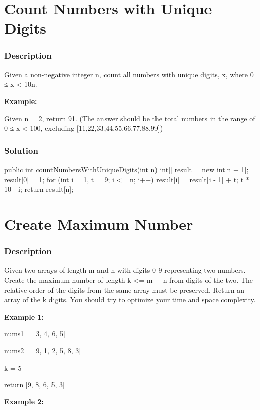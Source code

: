 \section{Count Numbers with Unique Digits} %

\subsubsection{Description}
Given a non-negative integer n, count all numbers with unique digits, x, where 0 ≤ x < 10n.

\textbf{Example:}

Given n = 2, return 91. (The answer should be the total numbers in the range of 0 ≤ x < 100, excluding [11,22,33,44,55,66,77,88,99])

\subsubsection{Solution}

\begin{Code}
public int countNumbersWithUniqueDigits(int n) {
    int[] result = new int[n + 1];
    result[0] = 1;
    for (int i = 1, t = 9; i <= n; i++) {
        result[i] = result[i - 1] + t;
        t *= 10 - i;
    }
    return result[n];
}
\end{Code}

\newpage

\section{Create Maximum Number} %

\subsubsection{Description}
Given two arrays of length m and n with digits 0-9 representing two numbers. Create the maximum number of length k <= m + n from digits of the two. The relative order of the digits from the same array must be preserved. Return an array of the k digits. You should try to optimize your time and space complexity.

\textbf{Example 1:}

nums1 = [3, 4, 6, 5]

nums2 = [9, 1, 2, 5, 8, 3]

k = 5

return [9, 8, 6, 5, 3]

\textbf{Example 2:}

